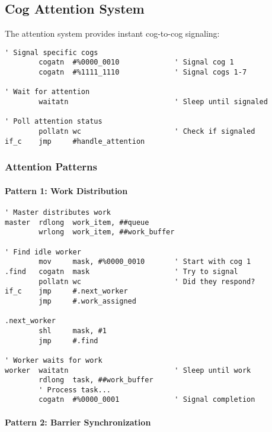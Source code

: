 \documentclass[11pt]{book}
\begin{document}
\hypertarget{cog-attention-system}{%
\subsection{Cog Attention System}\label{cog-attention-system}}

The attention system provides instant cog-to-cog signaling:

\begin{lstlisting}
' Signal specific cogs
        cogatn  #%0000_0010             ' Signal cog 1
        cogatn  #%1111_1110             ' Signal cogs 1-7
        
' Wait for attention
        waitatn                         ' Sleep until signaled
        
' Poll attention status
        pollatn wc                      ' Check if signaled
if_c    jmp     #handle_attention
\end{lstlisting}

\hypertarget{attention-patterns}{%
\subsubsection{Attention Patterns}\label{attention-patterns}}

\hypertarget{pattern-1-work-distribution}{%
\paragraph{Pattern 1: Work
Distribution}\label{pattern-1-work-distribution}}

\begin{lstlisting}
' Master distributes work
master  rdlong  work_item, ##queue
        wrlong  work_item, ##work_buffer
        
' Find idle worker
        mov     mask, #%0000_0010       ' Start with cog 1
.find   cogatn  mask                    ' Try to signal
        pollatn wc                      ' Did they respond?
if_c    jmp     #.next_worker
        jmp     #.work_assigned
        
.next_worker
        shl     mask, #1
        jmp     #.find

' Worker waits for work
worker  waitatn                         ' Sleep until work
        rdlong  task, ##work_buffer
        ' Process task...
        cogatn  #%0000_0001             ' Signal completion
\end{lstlisting}

\hypertarget{pattern-2-barrier-synchronization}{%
\paragraph{Pattern 2: Barrier
Synchronization}\label{pattern-2-barrier-synchronization}}
\end{document}
